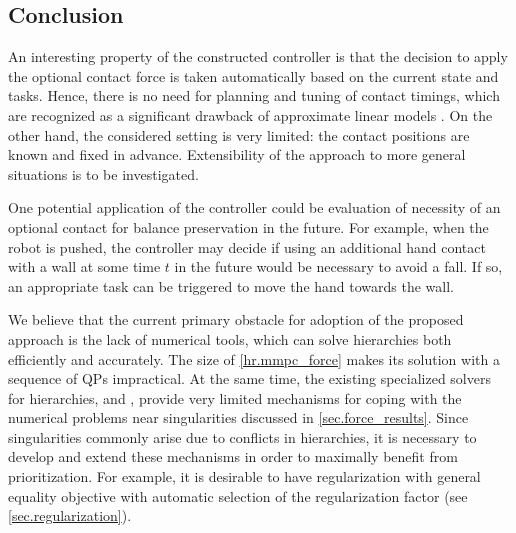 \begin{figure}[!htbp]
\end{figure}



\begin{figure}[!htbp]
\end{figure}




\subsection{Conclusion}\label{sec.force_conclusion}

An interesting property of the constructed controller is that the decision to
apply the optional contact force is taken automatically based on the current
state and tasks. Hence, there is no need for planning and tuning of contact
timings, which are recognized as a significant drawback of approximate linear
models \cite{Audren2014iros}. On the other hand, the considered setting is very
limited: the contact positions are known and fixed in advance. Extensibility of
the approach to more general situations is to be investigated.


One potential application of the controller could be evaluation of necessity of
an optional contact for balance preservation in the future. For example, when
the robot is pushed, the controller may decide if using an additional hand
contact with a wall at some time $t$ in the future would be necessary to avoid
a fall. If so, an appropriate task can be triggered to move the hand towards
the wall.


We believe that the current primary obstacle for adoption of the proposed
approach is the lack of numerical tools, which can solve hierarchies both
efficiently and accurately. The size of \cref{hr.mmpc_force} makes its solution
with a sequence of \acs{QP}s impractical. At the same time, the existing
specialized solvers for hierarchies,  \cite{Dimitrov2015preprint} and
 \cite{Escande2014ijrr, SOTHsite}, provide very limited mechanisms for
coping with the numerical problems near singularities discussed in
\cref{sec.force_results}. Since singularities commonly arise due to conflicts
in hierarchies, it is necessary to develop and extend these mechanisms in order
to maximally benefit from prioritization. For example, it is desirable to have
regularization with general equality objective with automatic selection of the
regularization factor (see \cref{sec.regularization}).




